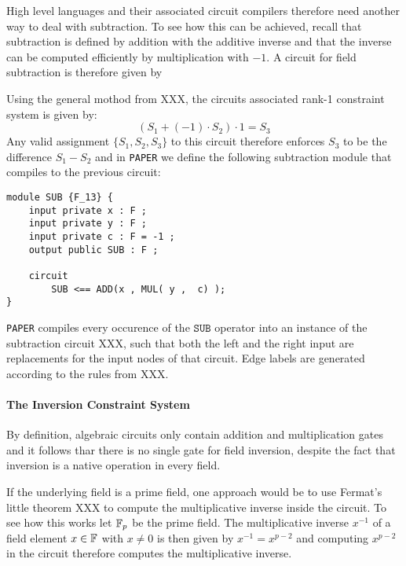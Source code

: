 High level languages and their associated circuit compilers therefore need another way to deal with subtraction. To see how this can be achieved, recall that subtraction is defined by addition with the additive inverse and that the inverse can be computed efficiently by multiplication with $-1$. A circuit for field subtraction is therefore given by
\begin{center}
\end{center}
Using the general mothod from XXX, the circuits associated rank-1 constraint system is given by:
\begin{equation}
\left(S_1 + (-1)\cdot S_2\right)\cdot 1 = S_3
\end{equation}
Any valid assignment $\{S_1,S_2, S_3\}$ to this circuit therefore enforces $S_3$ to be the difference $S_1- S_2$ and in \texttt{PAPER} we define the following subtraction module that compiles to the previous circuit:
\begin{lstlisting}
module SUB {F_13} {
	input private x : F ; 
	input private y : F ; 
	input private c : F = -1 ; 
	output public SUB : F ; 

	circuit
		SUB <== ADD(x , MUL( y ,  c) );
}
\end{lstlisting}
\texttt{PAPER} compiles every occurence of the $\mathtt{SUB}$ operator into an instance of the subtraction circuit XXX, such that both the left and the right input are replacements for the input nodes of that circuit. Edge labels are generated according to the rules from XXX.
\begin{example}

\end{example} 

\paragraph{The Inversion Constraint System} By definition, algebraic circuits only contain addition and multiplication gates and it follows thar there is no single gate for field inversion, despite the fact that inversion is a native operation in every field. 

If the underlying field is a prime field, one approach would be to use Fermat's little theorem XXX to compute the multiplicative inverse inside the circuit. To see how this works let $\mathbb{F}_p$ be the prime field. The multiplicative inverse $x^{-1}$ of a field element $x\in\mathbb{F}$ with $x\neq 0$ is then given by $x^{-1}= x^{p-2}$ and computing $x^{p-2}$ in the circuit therefore computes the multiplicative inverse. 

